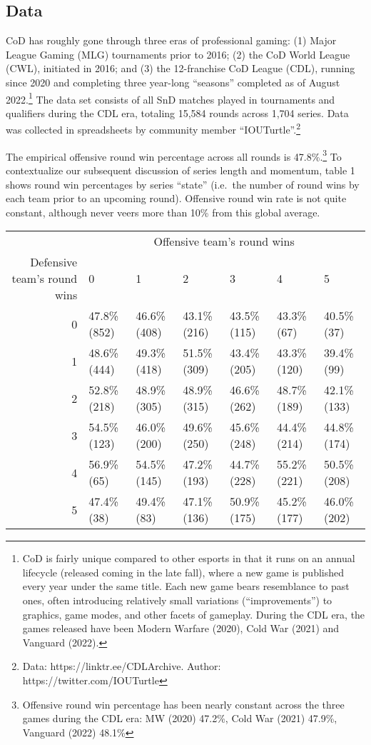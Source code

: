 \documentclass[
]{article}
\begin{document}
\hypertarget{data}{%
\subsection{Data}\label{data}}

CoD has roughly gone through three eras of professional gaming: (1)
Major League Gaming (MLG) tournaments prior to 2016; (2) the CoD World
League (CWL), initiated in 2016; and (3) the 12-franchise CoD League
(CDL), running since 2020 and completing three year-long ``seasons''
completed as of August 2022.\footnote{CoD is fairly unique compared to
  other esports in that it runs on an annual lifecycle (released coming
  in the late fall), where a new game is published every year under the
  same title. Each new game bears resemblance to past ones, often
  introducing relatively small variations (``improvements'') to
  graphics, game modes, and other facets of gameplay. During the CDL
  era, the games released have been Modern Warfare (2020), Cold War
  (2021) and Vanguard (2022).} The data set consists of all SnD matches
played in tournaments and qualifiers during the CDL era, totaling 15,584
rounds across 1,704 series. Data was collected in spreadsheets by
community member ``IOUTurtle''.\footnote{Data:
  https://linktr.ee/CDLArchive. Author: https://twitter.com/IOUTurtle}

The empirical offensive round win percentage across all rounds is
47.8\%.\footnote{Offensive round win percentage has been nearly constant
  across the three games during the CDL era: MW (2020) 47.2\%, Cold War
  (2021) 47.9\%, Vanguard (2022) 48.1\%} To contextualize our subsequent
discussion of series length and momentum, table 1 shows round win
percentages by series ``state'' (i.e.~the number of round wins by each
team prior to an upcoming round). Offensive round win rate is not quite
constant, although never veers more than 10\% from this global average.

\captionsetup[table]{labelformat=empty,skip=1pt}
\begin{longtable}{rllllll}
\toprule
 & \multicolumn{6}{c}{Offensive team's round wins} \\ 
\cmidrule(r){2-7}
Defensive team's round wins & 0 & 1 & 2 & 3 & 4 & 5 \\ 
\midrule
0 & 47.8\%
(852) & 46.6\%
(408) & 43.1\%
(216) & 43.5\%
(115) & 43.3\%
(67) & 40.5\%
(37) \\ 
1 & 48.6\%
(444) & 49.3\%
(418) & 51.5\%
(309) & 43.4\%
(205) & 43.3\%
(120) & 39.4\%
(99) \\ 
2 & 52.8\%
(218) & 48.9\%
(305) & 48.9\%
(315) & 46.6\%
(262) & 48.7\%
(189) & 42.1\%
(133) \\ 
3 & 54.5\%
(123) & 46.0\%
(200) & 49.6\%
(250) & 45.6\%
(248) & 44.4\%
(214) & 44.8\%
(174) \\ 
4 & 56.9\%
(65) & 54.5\%
(145) & 47.2\%
(193) & 44.7\%
(228) & 55.2\%
(221) & 50.5\%
(208) \\ 
5 & 47.4\%
(38) & 49.4\%
(83) & 47.1\%
(136) & 50.9\%
(175) & 45.2\%
(177) & 46.0\%
(202) \\ 
\bottomrule
\end{longtable}
\end{document}
